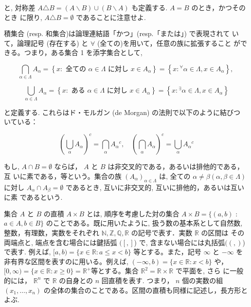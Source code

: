 \documentclass[14pt]{jsarticle}
\begin{document}
と, 対称差 $A \triangle B=(A \backslash B) \cup(B \backslash A)$ も定義する. $A=B$ のとき，かつそのとき に限り, $A \triangle B=\emptyset$ であることに注意せよ.

積集合 (resp. 和集合)は論理連結語「かつ」(resp.「または」) で表現されて いて，論理記号 (存在する) と $\forall$ (全ての)を用いて，任意の族に拡張すること ができる。つまり，ある集合 1 を添字集合として,

$$
\bigcap_{\alpha \in \Lambda} A_{\alpha}=\left\{x: \text { 全ての } \alpha \in \Lambda \text { に対し } x \in A_{\alpha}\right\}=\left\{x:{ }^{\forall} \alpha \in \Lambda, x \in A_{\alpha}\right\} \text {, }
$$

$$
\bigcup_{\alpha \in \Lambda} A_{\alpha}=\left\{x: \text { ある } \alpha \in \Lambda \text { に対し } x \in A_{\alpha}\right\}=\left\{x:{ }^{\exists} \alpha \in \Lambda, x \in A_{\alpha}\right\}
$$

と定義する. これらはド・モルガン (de Morgan) の法則で以下のように結びつ いている：

$$
\left(\bigcup_{\alpha} A_{\alpha}\right)^{c}=\bigcap_{\alpha} A_{\alpha}{ }^{c}, \quad\left(\bigcap_{\alpha} A_{\alpha}\right)^{c}=\bigcup_{\alpha} A_{\alpha}{ }^{c}
$$

もし, $A \cap B=\emptyset$ ならば， $A$ と $B$ は非交叉的である，あるいは排他的である，互 いに素である，等という。集合の族 $\left(A_{\alpha}\right)_{\alpha \in \Lambda}$ は, 全ての $\alpha \neq \beta(\alpha, \beta \in \Lambda)$ に対し $A_{\alpha} \cap A_{\beta}=\emptyset$ であるとき, 互いに非交叉的, 互いに排他的，あるいは互いに素 であるという.

集合 $A$ と $B$ の直積 $A \times B$ とは, 順序を考慮した対の集合 $A \times B=\{(a, b)$ : $a \in A, b \in B\}$ のことである。既に用いたように, 扱う数の基本系として自然数,整数，有理数，実数をそれぞれ $\mathbb{N}, \mathbb{Z}, \mathbb{Q}, \mathbb{R}$ の記号で表す．実数 $\mathbb{R}$ の区間は その両端点と, 端点を含む場合には鍵括弧 $([,]$) で, 含まない場合には丸括弧$ ((,)$) で表す. 例えば, $[a, b)=\{x \in \mathbb{R}: a \leq x<b\}$ 等とする。また，記号 $\infty$ と $-\infty$ を非有界な区間を表すのに用いる。例えば, $(-\infty, b)=\{x \in \mathbb{R}: x<b\}$ や， $[0, \infty)=\{x \in \mathbb{R}: x \geq 0\}=\mathbb{R}^{+}$等とする。集合 $\mathbb{R}^{2}=\mathbb{R} \times \mathbb{R}$ で平面を, さら に一般的には， $\mathbb{R}^{n}$ で $\mathbb{R}$ の自身との $n$ 回直積を表す. つまり， $n$ 個の実数の組 $\left(x_{1}, \ldots, x_{n}\right)$ の全体の集合のことである。区間の直積も同様に記述し，長方形と よぶ.
\end{document}
